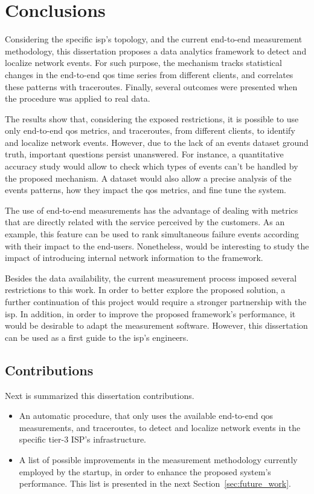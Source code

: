 \chapter{Conclusions}
\label{chap:conclusion}

Considering the specific \gls*{isp}'s topology, and the current end-to-end measurement
methodology, this dissertation proposes a data analytics framework to
detect and localize network events.
For such purpose, the mechanism tracks
statistical changes in the end-to-end \gls*{qos} time series from different clients,
and correlates these patterns with traceroutes.
Finally, several outcomes were presented when the procedure was applied to
real data.

The results show that, considering the exposed restrictions,
it is possible to use only end-to-end \gls*{qos} metrics, and traceroutes, from
different clients, to identify and localize network events.
However, due to the lack of an events dataset ground truth, important
questions persist unanswered.
For instance, a quantitative accuracy study
would allow to check which types of events can't be handled by the
proposed mechanism.
A dataset would also allow a precise analysis of the events
patterns, how they impact the \gls*{qos} metrics, and fine tune the system.

The use of end-to-end measurements has the advantage of dealing with
metrics that are directly related with the service perceived by the customers.
As an example, this feature can be used to rank simultaneous failure events
according with their impact to the end-users.
Nonetheless, would be interesting to study the impact of introducing
internal network information to the framework.

Besides the data availability, the current measurement process imposed
several restrictions to this work.
In order to better explore the proposed solution,
a further continuation of this project
would require a stronger partnership with the \gls*{isp}.
In addition, in order to improve the proposed framework's performance,
it would be desirable to adapt the measurement software.
However, this dissertation can be used as a first guide to the \gls*{isp}'s engineers.

\section{Contributions}
Next is summarized this dissertation contributions.

\begin{itemize}
\item
An automatic procedure, that only uses the available end-to-end \gls*{qos}
measurements, and traceroutes, to detect and localize network events in the
specific tier-3 ISP's infrastructure.

\item
A list of possible improvements in the measurement methodology currently
employed by the startup, in order to enhance the proposed system's performance. This
list is presented in the next Section~\ref{sec:future_work}.
\end{itemize}

